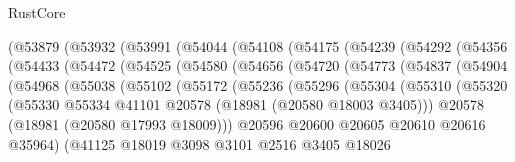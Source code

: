 \begin{lexlean}{RustCore}
\begin{coremodule}
          (@53879
            (@53932
              (@53991
                (@54044
                  (@54108
                    (@54175
                      (@54239
                        (@54292
                          (@54356
                            (@54433
                              (@54472
                                (@54525
                                  (@54580
                                    (@54656
                                      (@54720
                                        (@54773
                                          (@54837
                                            (@54904
                                              (@54968
                                                (@55038
                                                  (@55102
                                                    (@55172
                                                      (@55236
                                                        (@55296
                                                          (@55304
                                                            (@55310
                                                              (@55320
                                                                (@55330
                                                                  @55334
                                                                  @41101
                                                                  @20578
                                                                  (@18981 (@20580 @18003 @3405)))
                                                                @20578
                                                                (@18981 (@20580 @17993 @18009)))
                                                              @20596
                                                              @20600
                                                              @20605
                                                              @20610
                                                              @20616
                                                              @35964)
                                                            (@41125
                                                              @18019
                                                              @3098
                                                              @3101
                                                              @2516
                                                              @3405
                                                              @18026

\end{coremodule}
\end{lexlean}
